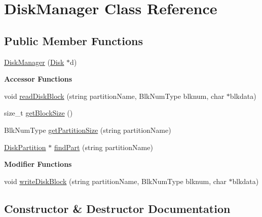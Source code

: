 \hypertarget{classDiskManager}{}\section{Disk\+Manager Class Reference}
\label{classDiskManager}
\subsection*{Public Member Functions}
\begin{DoxyCompactItemize}
\item 
\mbox{\hyperlink{classDiskManager_a948cecec230d9895bafaced5534fd6cf}{Disk\+Manager}} (\mbox{\hyperlink{classDisk}{Disk}} $\ast$d)
\end{DoxyCompactItemize}
\begin{Indent}\textbf{ Accessor Functions}\par
\begin{DoxyCompactItemize}
\item 
void \mbox{\hyperlink{classDiskManager_afda24be04fb85711236a4d5905a5ad1c}{read\+Disk\+Block}} (string partition\+Name, Blk\+Num\+Type blknum, char $\ast$blkdata)
\item 
size\+\_\+t \mbox{\hyperlink{classDiskManager_aabdfbb2171f3c19a3ae14f9532876404}{get\+Block\+Size}} ()
\item 
Blk\+Num\+Type \mbox{\hyperlink{classDiskManager_ae32627ccfa72013e35da637570e1729b}{get\+Partition\+Size}} (string partition\+Name)
\item 
\mbox{\hyperlink{structDiskPartition}{Disk\+Partition}} $\ast$ \mbox{\hyperlink{classDiskManager_a08375c254bc09c8351a4f96cb669f1ab}{find\+Part}} (string partition\+Name)
\end{DoxyCompactItemize}
\end{Indent}
\begin{Indent}\textbf{ Modifier Functions}\par
\begin{DoxyCompactItemize}
\item 
void \mbox{\hyperlink{classDiskManager_ac96846d309a59e8ac7b100724329cb30}{write\+Disk\+Block}} (string partition\+Name, Blk\+Num\+Type blknum, char $\ast$blkdata)
\end{DoxyCompactItemize}
\end{Indent}


\subsection{Constructor \& Destructor Documentation}
\mbox{\label{classDiskManager_a948cecec230d9895bafaced5534fd6cf}} 
